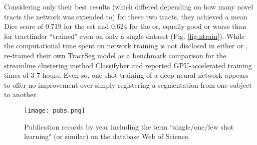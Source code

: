 Considering only their best results (which differed depending on how many novel tracts the network was extended to) for these two tracts, they achieved a mean Dice score of 0.719 for the \gls{cst} and 0.624 for the \gls{or}, equally good or worse than for tractfinder ``trained" even on only a single dataset (Fig. \ref{fig:ntrain}).
While the computational time spent on network training is not disclosed in either \textcite{Liu2023a} or \textcite{Wasserthal2018}, \textcite{Berto2021} re-trained their own TractSeg model as a benchmark comparison for the streamline clustering method Classifyber and reported GPU-accelerated training times of 3-7 hours.
Even so, one-shot training of a deep neural network appears to offer no improvement over simply registering a segmentation from one subject to another.

\begin{figure}[h!]
  \centering
  \texttt{[image: pubs.png]}
  \caption{Publication records by year including the term ``single/one/few shot learning" (or similar) on the database Web of Science.}
  \label{fig:pubs}
\end{figure}
